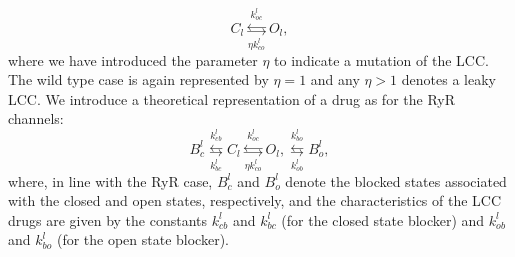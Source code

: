 \begin{equation}
C_{l}\underset{\eta k_{co}^{l}}{\overset{k_{oc}^{l}}{\leftrightarrows}}%
O_{l},\label{m_l2}%
\end{equation}
where we have introduced the parameter $\eta$ to indicate a mutation of the
LCC. The wild type case is again represented by $\eta=1$ and any
$\eta>1$ denotes a leaky LCC. We introduce a theoretical representation
of a drug as for the RyR channels:%
\begin{equation}
B_{c}^{l}\underset{k_{bc}^{l}}{\overset{k_{cb}^{l}}{\leftrightarrows}}%
C_{l}\underset{\eta k_{co}^{l}}{\overset{k_{oc}^{l}}{\leftrightarrows}}%
O_{l},\underset{k_{ob}^{l}}{\overset{k_{bo}^{l}}{\leftrightarrows}}B_{o}%
^{l}, \label{m_l2d}%
\end{equation}
where, in line with the RyR case, $B_{c}^{l}$ and $B_{o}^{l}$ denote the
blocked states associated with the closed and open states, respectively, and the
characteristics of the LCC drugs are given by the constants 
$k_{cb}^{l}$ and $k_{bc}^{l}$ (for the closed state blocker) 
and $k_{ob}^{l}$ and $k_{bo}^{l}$ (for the open state blocker). 

